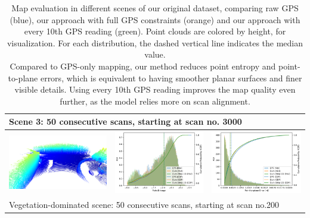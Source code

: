 \begin{table}[h]
{\begin{tabular}{ccc}
            \hline
            \multicolumn{3}{l}{Scene 3: 50 consecutive scans, starting at scan no. 3000}                                                               \\
            \hline
            \includegraphics[width=0.3\linewidth]{images/map_eval/viz-200--50.png}                     &
            \includegraphics[width=0.31\linewidth]{images/map_eval/entropy_gps_ours_skip-200--50.pdf}  &
            \includegraphics[width=0.31\linewidth]{images/map_eval/p2plane_gps_ours_skip-200--50.pdf}                                                  \\
            \hline
            \multicolumn{3}{l}{Vegetation-dominated scene: 50 consecutive scans, starting at scan no.200}                                              \\
            \hline
        \end{tabular}
    }

    \caption{Map evaluation in different scenes of our original dataset, comparing raw GPS (blue), our approach with full GPS constraints (orange) and our approach with every 10th GPS reading (green). Point clouds are colored by height, for visualization. For each distribution, the dashed vertical line indicates the median value.\\Compared to GPS-only mapping, our method reduces point entropy and point-to-plane errors, which is equivalent to having smoother planar surfaces and finer visible details. Using every 10th GPS reading improves the map quality even further, as the model relies more on scan alignment.}
    \label{tab:map-eval}
\end{table}


